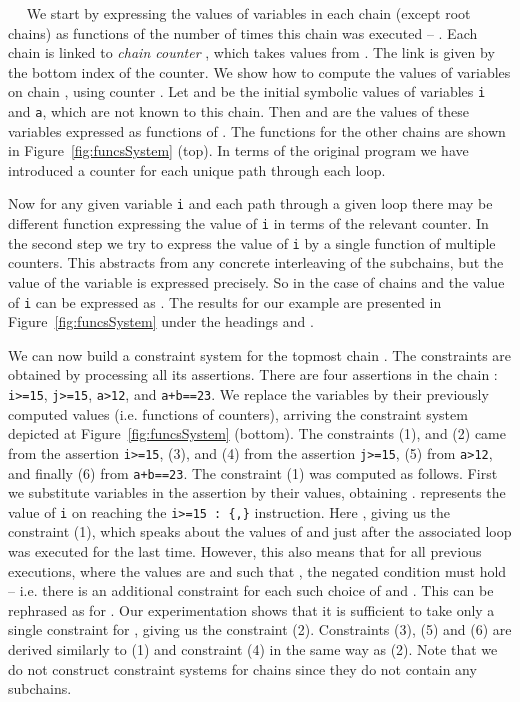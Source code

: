 \documentclass{llncs}
\renewcommand{\paragraph}[1]{\vspace{0.2cm}\noindent{\bf #1}~~}
\begin{document}
\paragraph{Phase 2: Building a constraint system}
We start by expressing the values of variables in each chain (except root chains) as functions of the number
of times this chain was executed -- . Each chain  is linked
to \emph{chain counter} , which takes values from . The link
is given by the bottom index of the counter. We show how to compute  the values
of variables on chain , using counter .  Let
 and  be the initial symbolic values
of variables \texttt{i} and \texttt{a}, which are not known to this chain. Then
 and  are the values of these variables expressed as functions
of . The functions for the other chains are shown in
Figure~\ref{fig:funcsSystem} (top). In terms of the original program we have
introduced a counter for each unique path through each loop.

Now for any given variable \texttt{i} and each path through a given loop
there may be different function expressing the value of \texttt{i} in terms
of the relevant counter. In the second step we try to express the value of
\texttt{i} by a single function of multiple counters.  This abstracts
from any concrete interleaving of the subchains, but the value of the
variable is expressed precisely. So in the case of chains  and  the value of
\texttt{i} can be expressed as .  The results for our example are presented in
Figure~\ref{fig:funcsSystem} under the headings
 and .

We can now build a constraint system for the topmost chain
. The constraints are obtained by processing all its assertions. There  are
four assertions in the chain : \texttt{i>=15}, \texttt{j>=15},
\texttt{a>12}, and \texttt{a+b==23}. We replace the variables by their
previously computed values (i.e. functions of counters), arriving the constraint
system   depicted at Figure~\ref{fig:funcsSystem}
(bottom).
The constraints (1), and (2) came from the assertion \texttt{i>=15}, (3),
and (4) from the assertion \texttt{j>=15}, (5) from \texttt{a>12}, and
finally (6) from \texttt{a+b==23}. The constraint (1) was computed as
follows. First we substitute variables in the assertion by their values,
obtaining .  represents the value of \texttt{i} on reaching
the \texttt{i>=15 : \{,\}} instruction. Here ,
giving us the constraint (1), which speaks about the values of 
and  just after the associated loop was executed for the last
time. However, this also means that for all previous executions, where the
values are  and  such that
, the negated condition  must hold -- i.e. there is an additional constraint for
each such choice of  and . This can be rephrased as
 for .
Our experimentation shows that it is sufficient to take only a single 
constraint for , giving us the constraint (2). Constraints (3), (5) and
(6) are derived similarly to (1) and constraint (4) in the same way as
(2). Note that we do not construct constraint systems for chains
 since they do not contain any subchains.
\end{document}
